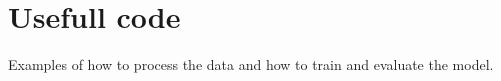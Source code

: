 \chapter{Usefull code}
\hypertarget{md__c_1_2_users_2_raul_2_documents_2_git_hub_2_m_s_e-_c_n_n-_implementations_2src_2msecnn__raulkb2081978c2269a6588b7e9312b2df998}{}\label{md__c_1_2_users_2_raul_2_documents_2_git_hub_2_m_s_e-_c_n_n-_implementations_2src_2msecnn__raulkb2081978c2269a6588b7e9312b2df998}
\label{md__c_1_2_users_2_raul_2_documents_2_git_hub_2_m_s_e-_c_n_n-_implementations_2src_2msecnn__raulkb2081978c2269a6588b7e9312b2df998_autotoc_md42}%
%
Examples of how to process the data and how to train and evaluate the model. 